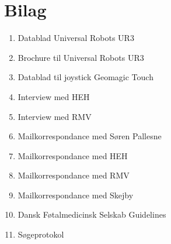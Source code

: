 \chapter{Bilag}
\begin{enumerate}
\item Datablad Universal Robots UR3
\item Brochure til Universal Robots UR3
\item Datablad til joystick Geomagic Touch
\item Interview med HEH
\item Interview med RMV
\item Mailkorrespondance med Søren Pallesne
\item Mailkorrespondance med HEH
\item Mailkorrespondance med RMV
\item Mailkorrespondance med Skejby
\item Dansk Føtalmedicinsk Selskab Guidelines
\item Søgeprotokol
\end{enumerate}

